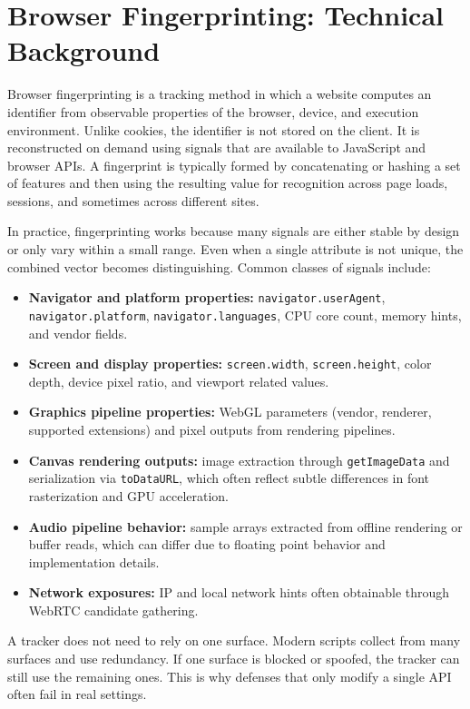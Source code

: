 \documentclass[11pt]{report}
\begin{document}
\section{Browser Fingerprinting: Technical Background}

Browser fingerprinting is a tracking method in which a website computes an identifier from observable properties of the browser, device, and execution environment. Unlike cookies, the identifier is not stored on the client. It is reconstructed on demand using signals that are available to JavaScript and browser APIs. A fingerprint is typically formed by concatenating or hashing a set of features and then using the resulting value for recognition across page loads, sessions, and sometimes across different sites.

In practice, fingerprinting works because many signals are either stable by design or only vary within a small range. Even when a single attribute is not unique, the combined vector becomes distinguishing. Common classes of signals include:

\begin{itemize}
    \item \textbf{Navigator and platform properties:} \texttt{navigator.userAgent}, \texttt{navigator.platform}, \newline \texttt{navigator.languages}, CPU core count, memory hints, and vendor fields.
    \item \textbf{Screen and display properties:} \texttt{screen.width}, \texttt{screen.height}, color depth, device pixel ratio, and viewport related values.
    \item \textbf{Graphics pipeline properties:} WebGL parameters (vendor, renderer, supported extensions) and pixel outputs from rendering pipelines.
    \item \textbf{Canvas rendering outputs:} image extraction through \texttt{getImageData} and serialization via \texttt{toDataURL}, which often reflect subtle differences in font rasterization and GPU acceleration.
    \item \textbf{Audio pipeline behavior:} sample arrays extracted from offline rendering or buffer reads, which can differ due to floating point behavior and implementation details.
    \item \textbf{Network exposures:} IP and local network hints often obtainable through WebRTC candidate gathering.
\end{itemize}

A tracker does not need to rely on one surface. Modern scripts collect from many surfaces and use redundancy. If one surface is blocked or spoofed, the tracker can still use the remaining ones. This is why defenses that only modify a single API often fail in real settings.
\end{document}

